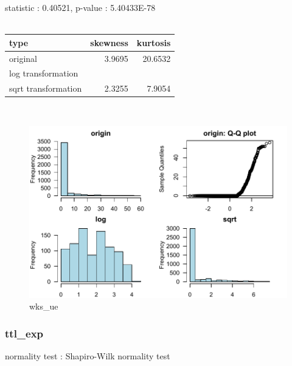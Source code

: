 \documentclass{book}\usepackage[]{graphicx}\usepackage[]{color}
\begin{document}
\noindent statistic : 0.40521,  p-value : 5.40433E-78\\
\\%
\begin{tabular}{lrr}
  \toprule
type & skewness & kurtosis \\ 
  \midrule
original & 3.9695 & 20.6532 \\ 
  log transformation &  &  \\ 
  sqrt transformation & 2.3255 & 7.9054 \\ 
   \bottomrule
\end{tabular}
\\
\begin{figure}[!ht]
\centering
\includegraphics[width=1.0\textwidth]{figure/norm16.pdf}
\caption{wks\_ue}
\end{figure}
\clearpage
\subsubsection{ ttl\_exp }

normality test : Shapiro-Wilk normality test
\end{document}
